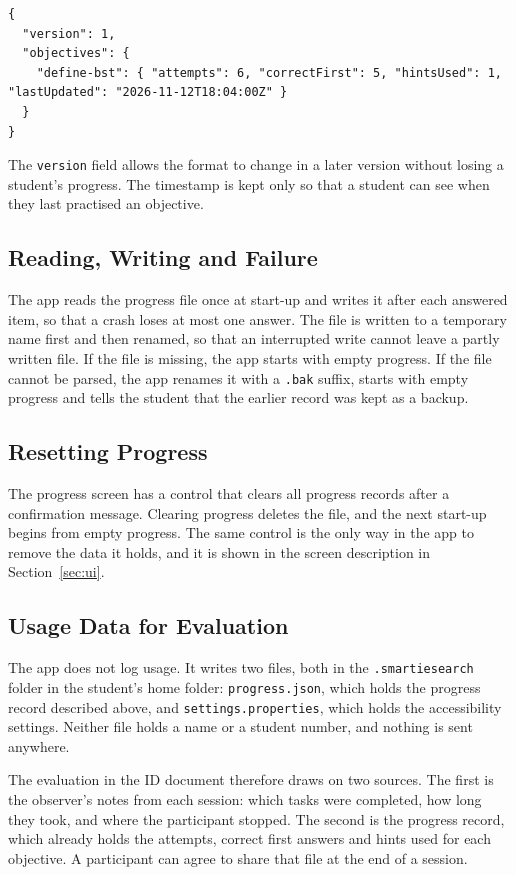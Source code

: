 \begin{lstlisting}
{
  "version": 1,
  "objectives": {
    "define-bst": { "attempts": 6, "correctFirst": 5, "hintsUsed": 1, "lastUpdated": "2026-11-12T18:04:00Z" }
  }
}
\end{lstlisting}

The \texttt{version} field allows the format to change in a later version without losing a student's progress. The timestamp is kept only so that a student can see when they last practised an objective.

\subsection{Reading, Writing and Failure}
The app reads the progress file once at start-up and writes it after each answered item, so that a crash loses at most one answer. The file is written to a temporary name first and then renamed, so that an interrupted write cannot leave a partly written file. If the file is missing, the app starts with empty progress. If the file cannot be parsed, the app renames it with a \texttt{.bak} suffix, starts with empty progress and tells the student that the earlier record was kept as a backup.

\subsection{Resetting Progress}
The progress screen has a control that clears all progress records after a confirmation message. Clearing progress deletes the file, and the next start-up begins from empty progress. The same control is the only way in the app to remove the data it holds, and it is shown in the screen description in Section~\ref{sec:ui}.

\subsection{Usage Data for Evaluation}
The app does not log usage. It writes two files, both in the \texttt{.smartiesearch} folder in the student's home folder: \texttt{progress.json}, which holds the progress record described above, and \texttt{settings.properties}, which holds the accessibility settings. Neither file holds a name or a student number, and nothing is sent anywhere.

The evaluation in the ID document therefore draws on two sources. The first is the observer's notes from each session: which tasks were completed, how long they took, and where the participant stopped. The second is the progress record, which already holds the attempts, correct first answers and hints used for each objective. A participant can agree to share that file at the end of a session.

